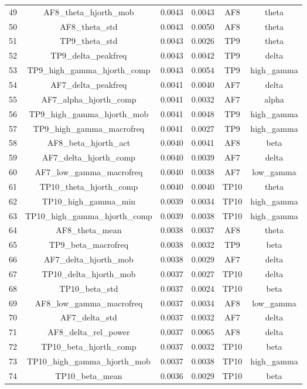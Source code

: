 \begin{table}[hptb]
\begin{table}
\begin{tabular}{cccccc}
49 & AF8_theta_hjorth_mob & 0.0043 & 0.0043 & AF8 & theta \\
50 & AF8_theta_std & 0.0043 & 0.0050 & AF8 & theta \\
51 & TP9_theta_std & 0.0043 & 0.0026 & TP9 & theta \\
52 & TP9_delta_peakfreq & 0.0043 & 0.0042 & TP9 & delta \\
53 & TP9_high_gamma_hjorth_comp & 0.0043 & 0.0054 & TP9 & high_gamma \\
54 & AF7_delta_peakfreq & 0.0041 & 0.0040 & AF7 & delta \\
55 & AF7_alpha_hjorth_comp & 0.0041 & 0.0032 & AF7 & alpha \\
56 & TP9_high_gamma_hjorth_mob & 0.0041 & 0.0048 & TP9 & high_gamma \\
57 & TP9_high_gamma_macrofreq & 0.0041 & 0.0027 & TP9 & high_gamma \\
58 & AF8_beta_hjorth_act & 0.0040 & 0.0041 & AF8 & beta \\
59 & AF7_delta_hjorth_comp & 0.0040 & 0.0039 & AF7 & delta \\
60 & AF7_low_gamma_macrofreq & 0.0040 & 0.0038 & AF7 & low_gamma \\
61 & TP10_theta_hjorth_comp & 0.0040 & 0.0040 & TP10 & theta \\
62 & TP10_high_gamma_min & 0.0039 & 0.0034 & TP10 & high_gamma \\
63 & TP10_high_gamma_hjorth_comp & 0.0039 & 0.0038 & TP10 & high_gamma \\
64 & AF8_theta_mean & 0.0038 & 0.0037 & AF8 & theta \\
65 & TP9_beta_macrofreq & 0.0038 & 0.0032 & TP9 & beta \\
66 & AF7_delta_hjorth_mob & 0.0038 & 0.0029 & AF7 & delta \\
67 & TP10_delta_hjorth_mob & 0.0037 & 0.0027 & TP10 & delta \\
68 & TP10_beta_std & 0.0037 & 0.0024 & TP10 & beta \\
69 & AF8_low_gamma_macrofreq & 0.0037 & 0.0034 & AF8 & low_gamma \\
70 & AF7_delta_std & 0.0037 & 0.0032 & AF7 & delta \\
71 & AF8_delta_rel_power & 0.0037 & 0.0065 & AF8 & delta \\
72 & TP10_beta_hjorth_comp & 0.0037 & 0.0032 & TP10 & beta \\
73 & TP10_high_gamma_hjorth_mob & 0.0037 & 0.0038 & TP10 & high_gamma \\
74 & TP10_beta_mean & 0.0036 & 0.0029 & TP10 & beta \\

\end{tabular}
\end{table}
\end{table}
